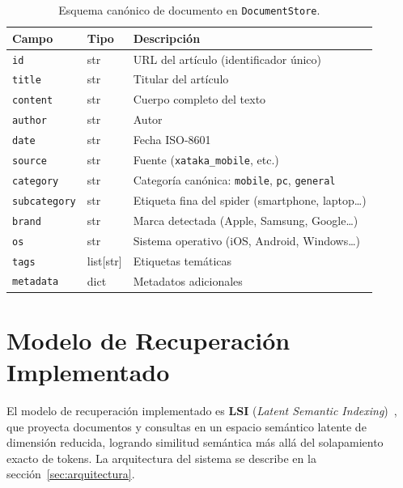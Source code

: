 \documentclass{llncs}
\begin{document}
\begin{table}[h]
  \centering
  \caption{Esquema canónico de documento en \texttt{DocumentStore}.}
  \begin{tabular}{lll}
    \toprule
    \textbf{Campo} & \textbf{Tipo} & \textbf{Descripción} \\
    \midrule
    \texttt{id}           & str       & URL del artículo (identificador único) \\
    \texttt{title}        & str       & Titular del artículo \\
    \texttt{content}      & str       & Cuerpo completo del texto \\
    \texttt{author}       & str       & Autor \\
    \texttt{date}         & str       & Fecha ISO-8601 \\
    \texttt{source}       & str       & Fuente (\texttt{xataka\_mobile}, etc.) \\
    \texttt{category}     & str       & Categoría canónica: \texttt{mobile}, \texttt{pc}, \texttt{general} \\
    \texttt{subcategory}  & str       & Etiqueta fina del spider (smartphone, laptop…) \\
    \texttt{brand}        & str       & Marca detectada (Apple, Samsung, Google…) \\
    \texttt{os}           & str       & Sistema operativo (iOS, Android, Windows…) \\
    \texttt{tags}         & list[str] & Etiquetas temáticas \\
    \texttt{metadata}     & dict      & Metadatos adicionales \\
    \bottomrule
  \end{tabular}
\end{table}

\section{Modelo de Recuperación Implementado}

El modelo de recuperación implementado es \textbf{LSI}
(\textit{Latent Semantic Indexing})~\cite{deerwester1990,manning2008},
que proyecta documentos y consultas en un espacio semántico latente de
dimensión reducida, logrando similitud semántica más allá del solapamiento
exacto de tokens. La arquitectura del sistema se describe en la
sección~\ref{sec:arquitectura}.
\end{document}
